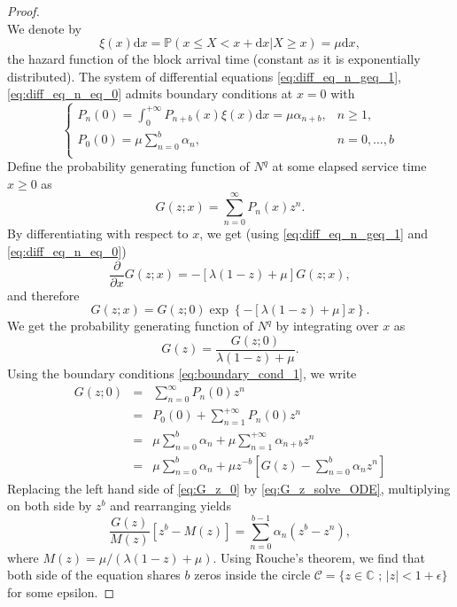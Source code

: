 \begin{proof}
\begin{equation}
\end{equation}
We denote by 
$$
\xi(x)\text{d}x =\mathbb{P}(x\leq X< x+\text{d}x|X\geq x)= \mu\text{d}x,
$$
the hazard function of the block arrival time (constant as it is exponentially distributed). The system of differential equations \eqref{eq:diff_eq_n_geq_1}, \eqref{eq:diff_eq_n_eq_0} admits boundary conditions at $x = 0$ with 
\begin{equation}\label{eq:boundary_cond_1}
\begin{cases}
P_{n}(0) = \int_0^{+\infty} P_{n+b}(x)\xi(x)\text{d}x = \mu\alpha_{n+b},&n \geq1,\\
P_{0}(0) = \mu\sum_{n=0}^{b}\alpha_n,&n = 0,\ldots,b\\
\end{cases}
\end{equation}
Define the probability generating function of $N^q$ at some elapsed service time $x\geq 0$ as 
$$
G(z;x) = \sum_{n=0}^\infty P_{n}(x)z^n.
$$
By differentiating with respect to $x$, we get (using \eqref{eq:diff_eq_n_geq_1} and \eqref{eq:diff_eq_n_eq_0})
$$
\frac{\partial}{\partial x}G(z;x) = -\left[\lambda(1-z)+\mu\right]G(z;x),
$$
and therefore
$$
G(z;x) = G(z;0)\exp\left\{-\left[\lambda(1-z)+\mu\right]x\right\}.
$$
We get the probability generating function of $N^q$ by integrating over $x$ as 
\begin{equation}\label{eq:G_z_solve_ODE}
G(z) = \frac{G(z;0)}{\lambda(1-z)+\mu}.
\end{equation}
Using the boundary conditions \eqref{eq:boundary_cond_1}, we write 
\begin{eqnarray}
G(z;0) &= &\sum_{n = 0}^\infty P_{n}(0)z^n \nonumber\\
&= &P_{0}(0)+\sum_{n=1}^{+\infty}P_{n}(0)z^n\nonumber\\
&=& \mu\sum_{n = 0}^{b}\alpha_n  + \mu\sum_{n=1}^{+\infty}\alpha_{n+b} z^n\nonumber\\
&=& \mu\sum_{n = 0}^{b}\alpha_n + \mu z^{-b}\left[G(z)-\sum_{n = 0}^{b}\alpha_n z^n\right]\label{eq:G_z_0}
\end{eqnarray}
Replacing the left hand side of \eqref{eq:G_z_0} by \eqref{eq:G_z_solve_ODE}, multiplying on both side by $z^b$ and rearranging yields 
\begin{equation}\label{eq:G_z_as_rational_function}
\frac{G(z)}{M(z)}[z^b - M(z)] =\sum_{n=0}^{b-1}\alpha_n(z^b - z^n), 
\end{equation}
where $M(z) = \mu/(\lambda(1-z)+\mu)$. Using Rouche's theorem, we find that both side of the equation shares $b$ zeros inside the circle $\mathcal{C} = \{z\in\mathbb{C}\text{ ; }|z| <1+\epsilon\}$ for some epsilon. 

\end{proof}
